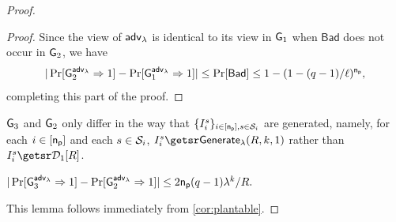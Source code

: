 \begin{proof}
\begin{proof}
Since the view of ${\mathsf{adv}}_\lambda$ is identical to its view in $\mathsf{G}_1$ when $\mathsf{Bad}$ does not occur in $\mathsf{G}_2$,  we have
	$$  |\Pr[\mathsf{G}_2^{{\mathsf{adv}}_\lambda}\Rightarrow 1]-\Pr[\mathsf{G}_1^{{\mathsf{adv}}_\lambda}\Rightarrow 1]| \leq \Pr[\mathsf{Bad}] \leq 1-(1-(q-1)/{\ell})^{\mathsf{n_p}},$$
	completing this part of the proof.
 \end{proof}
 
 $\mathsf{G}_3$ and $\mathsf{G}_2$ only differ in the way that $\{I_i^{s}\}_{i\in[\mathsf{n_p}], s\in\mathcal{S}_i}$ are generated, namely, for each $i \in [\mathsf{n_p}]$ and each $s \in \mathcal{S}_i$, $\instance_i^{s} \getsr \Generate(R, k, 1)$ rather than $\instance_i^{s} \getsr \zkcdistone{R}$.



\begin{lemma}
\label{lem:timenike-2}
$
|\Pr[\mathsf{G}_3^{{\mathsf{adv}}_\lambda}\Rightarrow 1]-\Pr[\mathsf{G}_2^{{\mathsf{adv}}_\lambda}\Rightarrow 1]|\leq 2\mathsf{n_p}(q-1)\lambda^{k}/{R}.
$
\end{lemma}
This lemma follows immediately from \cref{cor:plantable}.


\end{proof}
